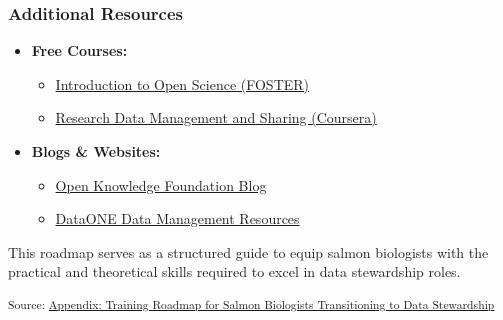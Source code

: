 \documentclass[
  letterpaper,
  DIV=11,
  numbers=noendperiod]{scrartcl}
\providecommand{\tightlist}{%
  \setlength{\itemsep}{0pt}\setlength{\parskip}{0pt}}\usepackage{longtable,booktabs,array}
\begin{document}
\subsubsection{Additional Resources}\label{additional-resources}

\begin{itemize}
\tightlist
\item
  \textbf{Free Courses:}

  \begin{itemize}
  \tightlist
  \item
    \href{https://www.fosteropenscience.eu/toolkit}{Introduction to Open
    Science (FOSTER)}
  \item
    \href{https://www.coursera.org/learn/data-management}{Research Data
    Management and Sharing (Coursera)}
  \end{itemize}
\item
  \textbf{Blogs \& Websites:}

  \begin{itemize}
  \tightlist
  \item
    \href{https://blog.okfn.org/}{Open Knowledge Foundation Blog}
  \item
    \href{https://www.dataone.org/resources/}{DataONE Data Management
    Resources}
  \end{itemize}
\end{itemize}

This roadmap serves as a structured guide to equip salmon biologists
with the practical and theoretical skills required to excel in data
stewardship roles.

\textsubscript{Source:
\href{https://br-johnson.github.io/sdm-paper/appendices/appendix-2-training-roadmap-preview.html\#7c3b2b24-38fb-439b-9e99-6e340c1fcb2b}{Appendix:
Training Roadmap for Salmon Biologists Transitioning to Data
Stewardship}}
\end{document}
